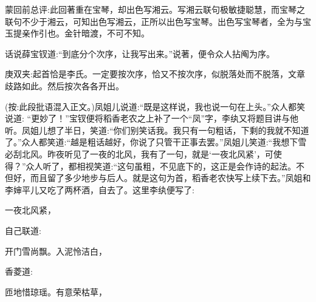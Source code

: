 

\begin{parag}
    \begin{note}蒙回前总评:此回著重在宝琴，却出色写湘云。写湘云联句极敏捷聪慧，而宝琴之联句不少于湘云，可知出色写湘云，正所以出色写宝琴。出色写宝琴者，全为与宝玉提亲作引也。金针暗渡，不可不知。\end{note}
\end{parag}


\begin{parag}
    话说薛宝钗道:“到底分个次序，让我写出来。”说著，便令众人拈阄为序。\begin{note}庚双夹:起首恰是李氏。一定要按次序，恰又不按次序，似脱落处而不脱落，文章歧路如此。然后按次各各开出。\end{note}(按:此段批语混入正文。)凤姐儿说道:“既是这样说，我也说一句在上头。”众人都笑说道: “更妙了！”宝钗便将稻香老农之上补了一个“凤”字，李纨又将题目讲与他听。凤姐儿想了半日，笑道:“你们别笑话我。我只有一句粗话，下剩的我就不知道了。”众人都笑道:“越是粗话越好，你说了只管干正事去罢。”凤姐儿笑道:“我想下雪必刮北风。昨夜听见了一夜的北风，我有了一句，就是‘一夜北风紧’，可使得？”众人听了，都相视笑道:“这句虽粗，不见底下的，这正是会作诗的起法。不但好，而且留了多少地步与后人。就是这句为首，稻香老农快写上续下去。”凤姐和李婶平儿又吃了两杯酒，自去了。这里李纨便写了:
\end{parag}


\begin{poem}
    \begin{pl} 一夜北风紧，\end{pl}
\end{poem}


\begin{parag}
    自己联道:
\end{parag}


\begin{poem}
    \begin{pl} 开门雪尚飘。入泥怜洁白，\end{pl}
\end{poem}


\begin{parag}
    香菱道:
\end{parag}


\begin{poem}
    \begin{pl} 匝地惜琼瑶。有意荣枯草，\end{pl}
\end{poem}


